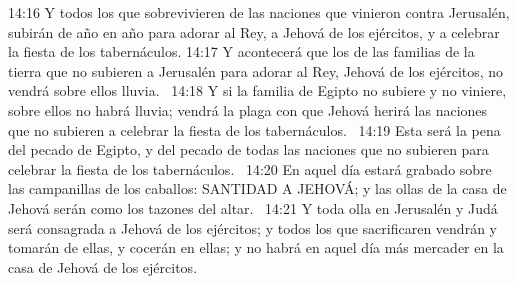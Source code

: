 14:16 Y todos los que sobrevivieren de las naciones que vinieron contra Jerusalén, subirán de año en año para adorar al Rey, a Jehová de los ejércitos, y a celebrar la fiesta de los tabernáculos. 
14:17 Y acontecerá que los de las familias de la tierra que no subieren a Jerusalén para adorar al Rey, Jehová de los ejércitos, no vendrá sobre ellos lluvia.  
14:18 Y si la familia de Egipto no subiere y no viniere, sobre ellos no habrá lluvia; vendrá la plaga con que Jehová herirá las naciones que no subieren a celebrar la fiesta de los tabernáculos.  
14:19 Esta será la pena del pecado de Egipto, y del pecado de todas las naciones que no subieren para celebrar la fiesta de los tabernáculos.  
14:20 En aquel día estará grabado sobre las campanillas de los caballos: SANTIDAD A JEHOVÁ; y las ollas de la casa de Jehová serán como los tazones del altar.  
14:21 Y toda olla en Jerusalén y Judá será consagrada a Jehová de los ejércitos; y todos los que sacrificaren vendrán y tomarán de ellas, y cocerán en ellas; y no habrá en aquel día más mercader en la casa de Jehová de los ejércitos.